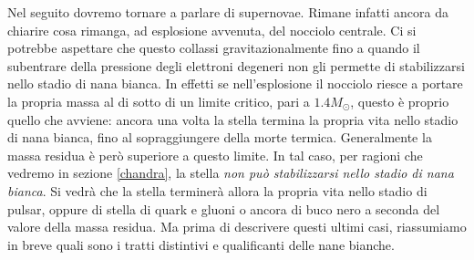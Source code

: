 \smallskip

Nel seguito dovremo tornare a parlare di supernovae. Rimane infatti ancora da chiarire cosa rimanga, ad esplosione avvenuta, del nocciolo centrale. Ci si potrebbe aspettare che questo collassi gravitazionalmente fino a quando il subentrare della pressione degli elettroni degeneri non gli permette di stabilizzarsi nello stadio di nana bianca. In effetti se nell'esplosione il nocciolo riesce a portare la propria massa al di sotto di un limite critico, pari a $1.4 M_{\odot}$, questo è proprio quello che avviene: ancora una volta la stella termina la propria vita nello stadio di nana bianca, fino al sopraggiungere della morte termica. Generalmente la massa residua è però superiore a questo limite. In tal caso, per ragioni che vedremo in sezione \ref{chandra}, la stella \emph{non può stabilizzarsi nello stadio di nana bianca}. Si vedr\`{a} che la stella terminer\`{a} allora la propria vita nello stadio di pulsar, oppure di stella di quark e gluoni o ancora di buco nero a seconda del valore della massa residua. Ma prima di descrivere questi ultimi casi, riassumiamo in breve quali sono i tratti distintivi e qualificanti delle nane bianche.
